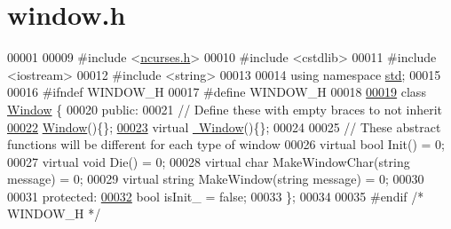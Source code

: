 \hypertarget{window_8h_source}{}\section{window.\+h}

\begin{DoxyCode}
00001 
00009 \textcolor{preprocessor}{#include <\mbox{\hyperlink{ncurses_8h}{ncurses.h}}>}
00010 \textcolor{preprocessor}{#include <cstdlib>}
00011 \textcolor{preprocessor}{#include <iostream>}
00012 \textcolor{preprocessor}{#include <string>}
00013 
00014 \textcolor{keyword}{using namespace }\mbox{\hyperlink{namespacestd}{std}};
00015 
00016 \textcolor{preprocessor}{#ifndef WINDOW\_H}
00017 \textcolor{preprocessor}{#define WINDOW\_H}
00018 
\mbox{\hyperlink{classWindow}{00019}} \textcolor{keyword}{class }\mbox{\hyperlink{classWindow}{Window}} \{
00020  \textcolor{keyword}{public}:
00021   \textcolor{comment}{// Define these with empty braces to not inherit}
\mbox{\hyperlink{classWindow_a74e6087da23d3c24e9fac0245e5ec92c}{00022}}   \mbox{\hyperlink{classWindow_a74e6087da23d3c24e9fac0245e5ec92c}{Window}}()\{\};
\mbox{\hyperlink{classWindow_a62b4a97b3c2e492f1d9a46092011e2d9}{00023}}   \textcolor{keyword}{virtual} \mbox{\hyperlink{classWindow_a62b4a97b3c2e492f1d9a46092011e2d9}{~Window}}()\{\};
00024 
00025   \textcolor{comment}{// These abstract functions will be different for each type of window}
00026   \textcolor{keyword}{virtual} \textcolor{keywordtype}{bool} Init() = 0;
00027   \textcolor{keyword}{virtual} \textcolor{keywordtype}{void} Die() = 0;
00028   \textcolor{keyword}{virtual} \textcolor{keywordtype}{char} MakeWindowChar(\textcolor{keywordtype}{string} message) = 0;
00029   \textcolor{keyword}{virtual} \textcolor{keywordtype}{string} MakeWindow(\textcolor{keywordtype}{string} message) = 0;
00030 
00031  \textcolor{keyword}{protected}:
\mbox{\hyperlink{classWindow_a06739ea2d178febdb7f0da5f775e5ba8}{00032}}   \textcolor{keywordtype}{bool} isInit\_ = \textcolor{keyword}{false};
00033 \};
00034 
00035 \textcolor{preprocessor}{#endif }\textcolor{comment}{/* WINDOW\_H */}\textcolor{preprocessor}{}
\end{DoxyCode}
